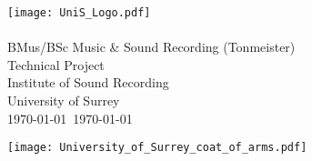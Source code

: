 \begin{titlepage}
    \thispagestyle{empty}
    \hfill\texttt{[image: UniS\_Logo.pdf]}
    {\sf
    \centering
    \null\vfil\vfil
        {
            \huge\LongTitle\\
        }
    \vfil\vfil\vfil
        {
            \Large\Me\\
        }
    \vfil\vfil\vfil
        {
            \Large{}BMus/BSc Music \& Sound Recording (Tonmeister)\\
            Technical Project\\
        }
    \vfil\vfil
        {
            \Large{}Institute of Sound Recording\\
            University of Surrey\\
        }
    \vfil
        {
            \Large\MyMonth\today~\MyYear\today\\}
        }
    
        {
            \texttt{[image: University\_of\_Surrey\_coat\_of\_arms.pdf]}
            \vspace{-.4in}
        }
    \end{titlepage}